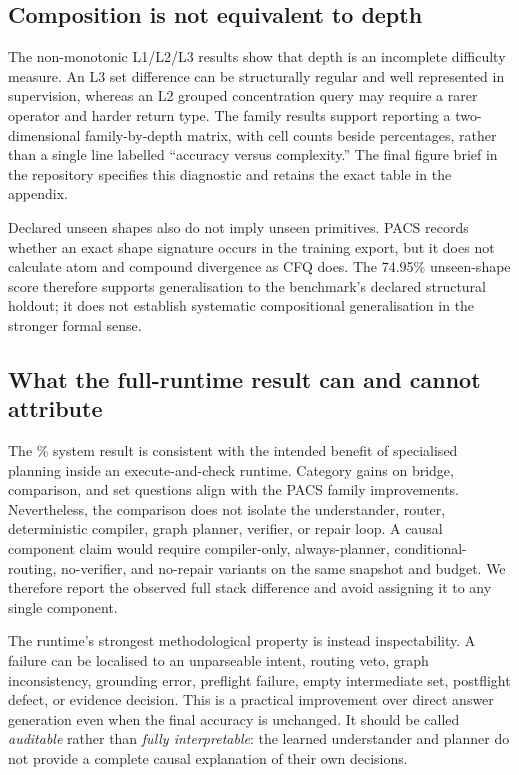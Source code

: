 \subsection{Composition is not equivalent to depth}

The non-monotonic L1/L2/L3 results show that depth is an incomplete difficulty measure.  An L3
set difference can be structurally regular and well represented in supervision, whereas an L2
grouped concentration query may require a rarer operator and harder return type.  The family
results support reporting a two-dimensional family-by-depth matrix, with cell counts beside
percentages, rather than a single line labelled ``accuracy versus complexity.''  The final
figure brief in the repository specifies this diagnostic and retains the exact table in the
appendix.

Declared unseen shapes also do not imply unseen primitives.  PACS records whether an exact shape
signature occurs in the training export, but it does not calculate atom and compound divergence
as CFQ does.  The 74.95\% unseen-shape score therefore supports generalisation to the benchmark's
declared structural holdout; it does not establish systematic compositional generalisation in
the stronger formal sense.

\subsection{What the full-runtime result can and cannot attribute}

The \RuntimeOurs\% system result is consistent with the intended benefit of specialised planning
inside an execute-and-check runtime.  Category gains on bridge, comparison, and set questions
align with the PACS family improvements.  Nevertheless, the comparison does not isolate the
understander, router, deterministic compiler, graph planner, verifier, or repair loop.  A causal
component claim would require compiler-only, always-planner, conditional-routing, no-verifier,
and no-repair variants on the same snapshot and budget.  We therefore report the observed full
stack difference and avoid assigning it to any single component.

The runtime's strongest methodological property is instead inspectability.  A failure can be
localised to an unparseable intent, routing veto, graph inconsistency, grounding error,
preflight failure, empty intermediate set, postflight defect, or evidence decision.  This is a
practical improvement over direct answer generation even when the final accuracy is unchanged.
It should be called \emph{auditable} rather than \emph{fully interpretable}: the learned
understander and planner do not provide a complete causal explanation of their own decisions.

